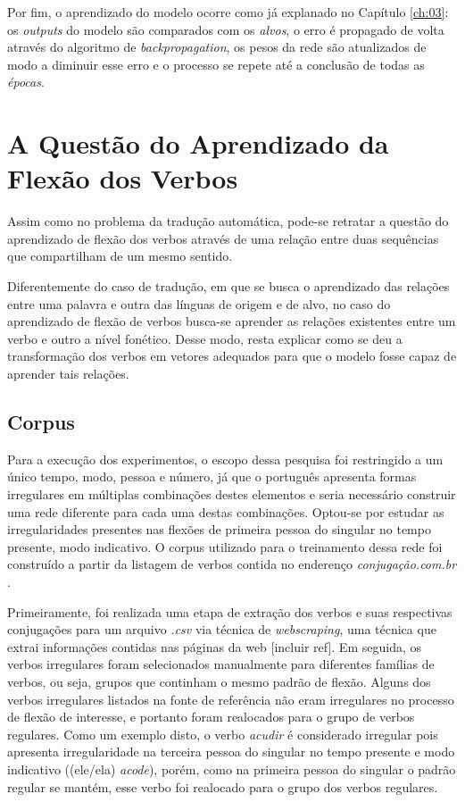  
 
 Por fim, o aprendizado do modelo ocorre como já explanado no Capítulo \ref{ch:03}: os \textit{outputs} do modelo são comparados com os \textit{alvos}, o erro é propagado de volta através do algoritmo de \textit{backpropagation}, os pesos da rede são atualizados de modo a diminuir esse erro e o processo se repete até a conclusão de todas as \textit{épocas}.
 
\section{A Questão do Aprendizado da Flexão dos Verbos}

Assim como no problema da tradução automática, pode-se retratar a questão do aprendizado de flexão dos verbos através de uma relação entre duas sequências que compartilham de um mesmo sentido.



Diferentemente do caso de tradução, em que se busca o aprendizado das relações entre uma palavra e outra das línguas de origem e de alvo, no caso do aprendizado de flexão de verbos busca-se aprender as relações existentes entre um verbo e outro a nível fonético. Desse modo, resta explicar como se deu a transformação dos verbos em vetores adequados para que o modelo fosse capaz de aprender tais relações.

\subsection{Corpus}

Para a execução dos experimentos, o escopo dessa pesquisa foi restringido a um único tempo, modo, pessoa e número, já que o português apresenta formas irregulares em múltiplas combinações destes elementos e seria necessário construir uma rede diferente para cada uma destas combinações. Optou-se por estudar as irregularidades presentes nas flexões de primeira pessoa do singular no tempo presente, modo indicativo.  
O corpus utilizado para o treinamento dessa rede foi construído a partir da listagem de verbos contida no enderenço \textit{conjugação.com.br} \cite{conjugacao.com.br}.

Primeiramente, foi realizada uma etapa de extração dos verbos e suas respectivas conjugações para um arquivo \textit{.csv} via técnica de \textit{webscraping}, uma técnica que extrai informações contidas nas páginas da web [incluir ref]. Em seguida, os verbos irregulares foram selecionados manualmente para diferentes famílias de verbos, ou seja, grupos que continham o mesmo padrão de flexão. Alguns dos verbos irregulares listados na fonte de referência não eram irregulares no processo de flexão de interesse, e portanto foram realocados para o grupo de verbos regulares. Como um exemplo disto, o verbo \textit{acudir} é considerado irregular pois apresenta irregularidade na terceira pessoa do singular no tempo presente e modo indicativo ((ele/ela) \textit{acode}), porém, como na primeira pessoa do singular o padrão regular se mantém, esse verbo foi realocado para o grupo dos verbos regulares. 

